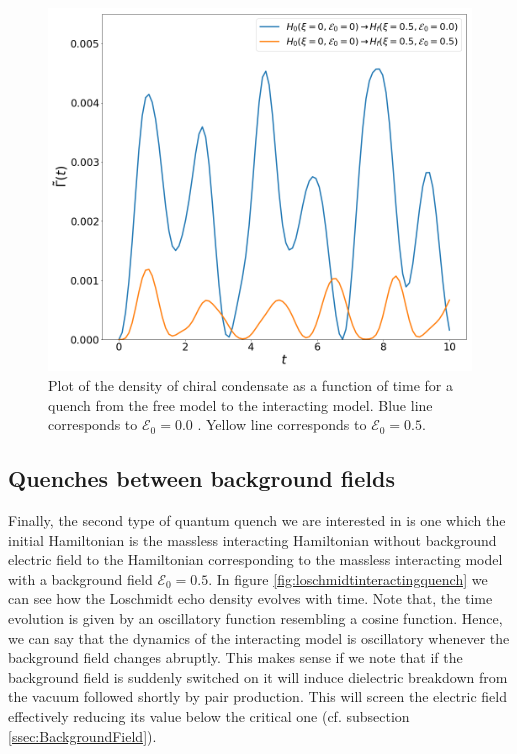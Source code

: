 \begin{figure}[h]
	\centering
	\includegraphics[scale=0.25]{figures/chiralNonInteractingQuenchMassless.png}
	\caption{Plot of the density of chiral condensate as a function of time for a quench from the free model to the interacting model. Blue line corresponds to $\mathcal{E}_0=0.0$ . Yellow line corresponds to $\mathcal{E}_0=0.5$.}
	\label{fig:chiralnoninteractingquench}
\end{figure}

\subsection{Quenches between background fields}

Finally, the second type of quantum quench we are interested in is one which the initial Hamiltonian is the massless interacting Hamiltonian without background electric field to the Hamiltonian corresponding to the massless interacting model with a background field $\mathcal{E}_0=0.5$. In figure \ref{fig:loschmidtinteractingquench} we can see how the Loschmidt echo density evolves with time. Note that, the time evolution is given by an oscillatory function resembling a cosine function. Hence, we can say that the dynamics of the interacting model is oscillatory whenever the background field changes abruptly. This makes sense if we note that if the background field is suddenly switched on it will induce dielectric breakdown from the vacuum followed shortly by pair production. This will screen the electric field effectively reducing its value below the critical one (cf. subsection \ref{ssec:BackgroundField}).

